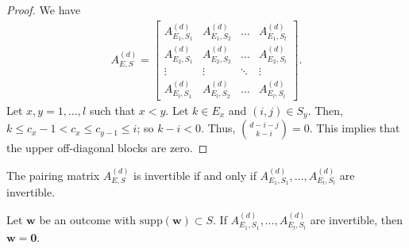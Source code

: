 \begin{proof}
    We have 
    \begin{align*}
        A_{E,S}^{(d)} = 
        \begin{bmatrix}
            A_{E_1,S_1}^{(d)} & A_{E_1,S_2}^{(d)} & \dots & A_{E_1,S_l}^{(d)} \\
            A_{E_2,S_1}^{(d)} & A_{E_2,S_2}^{(d)} & \dots & A_{E_2,S_l}^{(d)} \\
            \vdots & \vdots & \ddots & \vdots \\
            A_{E_l,S_1}^{(d)} & A_{E_l,S_2}^{(d)} & \dots & A_{E_l,S_l}^{(d)}
        \end{bmatrix}.
    \end{align*}
    Let \( x,y = 1, \dots , l \) such that \( x < y \). Let \( k \in E_x \) and \( (i,j) \in S_y \).
    Then, \( k \leq c_x - 1 < c_x \leq c_{y - 1} \leq i \); so \( k - i < 0 \). Thus, \( \binom{d-i-j}{k-i} = 0 \). This implies that the upper off-diagonal blocks are zero.
\end{proof}

\begin{corollary}
    The pairing matrix \( A^{(d)}_{E,S} \) is invertible if and only if \( A^{(d)}_{E_1,S_1}, \dots,  A^{(d)}_{E_l,S_l} \) are invertible.
\end{corollary}

\begin{corollary}\label{cor:invertibility-criterion-nooos}
    Let \( \mathbf{w} \) be an outcome with \( \mathrm{supp}(\mathbf w) \subset S \).
    If \( A^{(d)}_{E_1,S_1}, \dots,  A^{(d)}_{E_l,S_l} \) are invertible, then \( \mathbf{w} = \mathbf 0 \).
\end{corollary}

